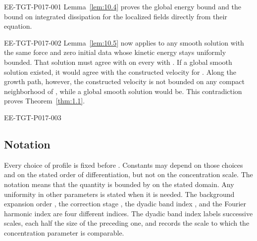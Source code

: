 %
\begin{EESegment}{EE-TGT-P017-001}
Lemma~\ref{lem:10.4} proves the global energy bound and the bound on integrated dissipation
for the localized fields directly from their equation.
\end{EESegment}

\begin{EESegment}{EE-TGT-P017-002}
Lemma~\ref{lem:10.5} now applies to any smooth solution with the same force and zero initial
data whose kinetic energy stays uniformly bounded. That solution must agree with
 on every  with
. If a global smooth solution existed, it would agree with the
constructed velocity for . Along the growth path, however,
the constructed velocity is not bounded on any compact neighborhood of
, while a global smooth solution would be. This contradiction
proves Theorem~\ref{thm:1.1}.
\end{EESegment}

\begin{EESegment}{EE-TGT-P017-003}
\subsection{Notation}\label{sec:3.6}
Every choice of profile is fixed before . Constants may
depend on those choices and on the stated order of differentiation, but not on the
concentration scale. The notation  means that the quantity is
bounded by  on the stated domain. Any uniformity in other
parameters is stated when it is needed. The background expansion order
, the correction stage , the dyadic band index
, and the Fourier harmonic index are four different indices. The dyadic
band index labels successive scales, each half the size of the preceding one, and records the scale
to which the concentration parameter is comparable.
\end{EESegment}


